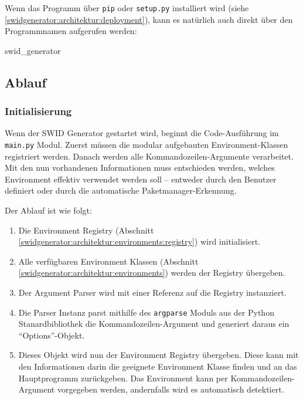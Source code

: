 Wenn das Programm über \texttt{pip} oder \texttt{setup.py} installiert wird (siehe
\autoref{swidgenerator:architektur:deployment}), kann es natürlich auch direkt
über den Programmnamen aufgerufen werden:

\begin{bashcode}
swid_generator
\end{bashcode}

\subsection{Ablauf}

\subsubsection{Initialisierung}
\label{swidgenerator:architektur:initialisierung}

Wenn der SWID Generator gestartet wird, beginnt die Code-Ausführung im
\texttt{main.py} Modul. Zuerst müssen die modular aufgebauten
Environment-Klassen registriert werden. Danach werden alle
Kommandozeilen-Argumente verarbeitet. Mit den nun vorhandenen Informationen muss
entschieden werden, welches Environment effektiv verwendet werden soll --
entweder durch den Benutzer definiert oder durch die automatische
Paketmanager-Erkennung.

Der Ablauf ist wie folgt:

\begin{enumerate}
	\item Die Environment Registry
		(Abschnitt \ref{swidgenerator:architektur:environments:registry}) wird initialisiert.
	\item Alle verfügbaren Environment Klassen
		(Abschnitt \ref{swidgenerator:architektur:environments}) werden der Registry
		übergeben.
	\item Der Argument Parser wird mit einer Referenz auf die Registry instanziert.
	\item Die Parser Instanz parst mithilfe des \texttt{argparse} Moduls aus der
		Python Stanardbibliothek die Kommandozeilen-Argument und generiert daraus ein
		\enquote{Options}-Objekt. \item Dieses Objekt wird nun der Environment Registry
		übergeben. Diese kann mit den Informationen darin die geeignete Environment
		Klasse finden und an das Hauptprogramm zurückgeben. Das Environment kann per
		Kommandozeilen-Argument vorgegeben werden, andernfalls wird es automatisch
		detektiert.
\end{enumerate}

